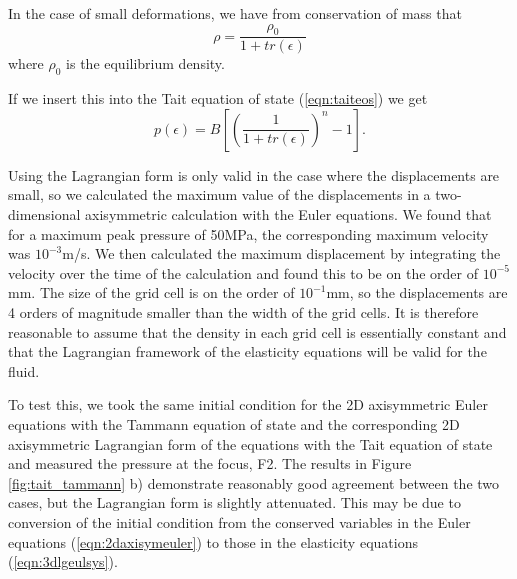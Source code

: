 \documentclass{article}
\begin{document}
In the case of small deformations, we have from conservation of mass that 
\begin{equation}
\rho = \frac{\rho_0}{1+tr(\epsilon)}
\end{equation}
where $\rho_0$ is the equilibrium density.

If we insert this into the Tait equation of state (\ref{eqn:taiteos}) we get
\begin{equation}\label{taiteps}
p(\epsilon) = B\left[ \left(\frac{1}{1 + tr(\epsilon)}\right)^n - 1\right].  
\end{equation} 


Using the Lagrangian form is
only valid in the case where the displacements are small, so we calculated the maximum value of 
the displacements in a two-dimensional axisymmetric calculation with the Euler equations.  We found 
that for a maximum peak pressure of 50MPa, the corresponding maximum
velocity was $10^{-3}$m/s.  We then calculated the maximum displacement by 
integrating the velocity over the time of the calculation and found this to be on the order of 
$10^{-5}$mm.  The size of the grid cell is on the order of $10^{-1}$mm, so the displacements are
4 orders of magnitude smaller than the width of the grid cells.  
It is therefore reasonable to assume that the density in each grid cell is essentially 
constant and that the Lagrangian framework of the elasticity equations will be valid for 
the fluid.  

To test this, we took the same initial condition for the 2D axisymmetric Euler equations with the 
Tammann equation of state and the corresponding 2D axisymmetric Lagrangian form of the equations 
with the Tait equation of state and measured the pressure at the focus, F2.  The results in Figure 
\ref{fig:tait_tammann} b) demonstrate reasonably good agreement between the two cases, but the 
Lagrangian form is slightly attenuated.  This may be due to conversion of the initial condition from the 
conserved variables in the Euler equations (\ref{eqn:2daxisymeuler}) to those in the elasticity equations 
(\ref{eqn:3dlgeulsys}).
\end{document}
